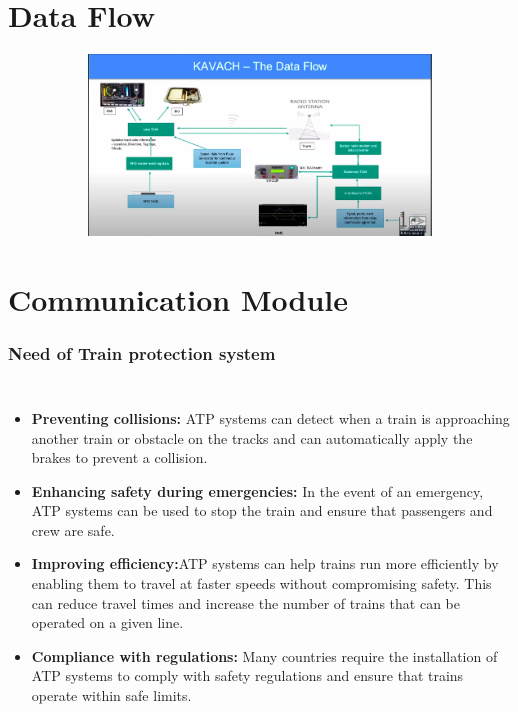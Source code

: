 \documentclass{beamer}
\begin{document}
\section{Data Flow}
\begin{frame}

\begin{figure}[h!]
  \centering
  \begin{subfigure}[b]{1\linewidth}
    \includegraphics[width=\linewidth]{./figs/data_flow.png}
  \end{subfigure}

\end{figure}

\end{frame}




\section{Communication Module}
\begin{frame}
\frametitle{Need of Train protection system}
\begin{columns}
  \begin{itemize}
  \item \textbf{Preventing collisions:} ATP systems can detect when a train is approaching another train or obstacle on the tracks and can automatically apply the brakes to prevent a collision.
  \item \textbf{Enhancing safety during emergencies:} In the event of an emergency, ATP systems can be used to stop the train and ensure that passengers and crew are safe.
  \item \textbf{Improving efficiency:}ATP systems can help trains run more efficiently by enabling them to travel at faster speeds without compromising safety. This can reduce travel times and increase the number of trains that can be operated on a given line.
   \item \textbf{Compliance with regulations:} Many countries require the installation of ATP systems to comply with safety regulations and ensure that trains operate within safe limits.
   
  \end{itemize}
\end{columns}

\end{frame}
\end{document}
